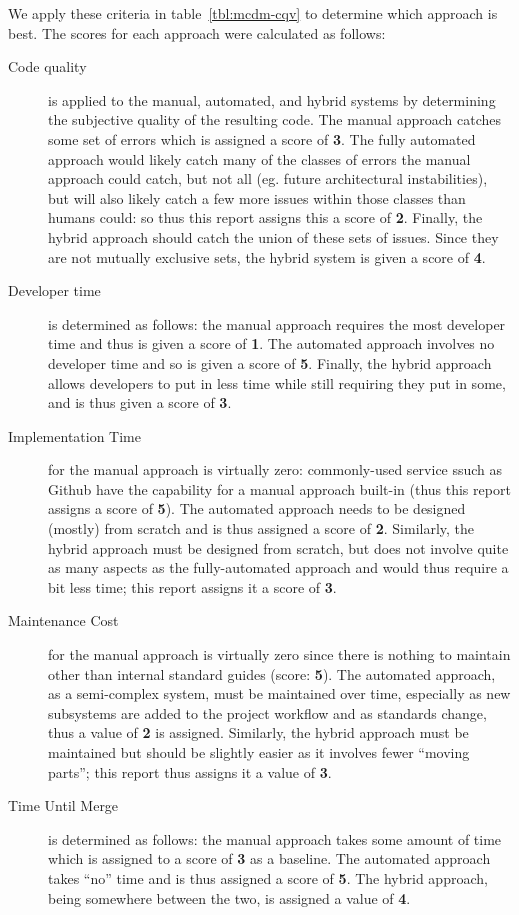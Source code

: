 \documentclass[12pt]{article}
\begin{document}
We apply these criteria in table~\ref{tbl:mcdm-cqv} to determine which approach is best. The scores for each approach were calculated as follows:
\begin{description}
\item[Code quality] is applied to the manual, automated, and hybrid systems by determining the subjective quality of the resulting code. The manual approach catches some set of errors which is assigned a score of {\bf 3}. The fully automated approach would likely catch many of the classes of errors the manual approach could catch, but not all (eg. future architectural instabilities), but will also likely catch a few more issues within those classes than humans could: so thus this report assigns this a score of {\bf 2}. Finally, the hybrid approach should catch the union of these sets of issues. Since they are not mutually exclusive sets, the hybrid system is given a score of {\bf 4}.
\item[Developer time] is determined as follows: the manual approach requires the most developer time and thus is given a score of {\bf 1}. The automated approach involves no developer time and so is given a score of {\bf 5}. Finally, the hybrid approach allows developers to put in less time while still requiring they put in some, and is thus given a score of {\bf 3}.
\item[Implementation Time] for the manual approach is virtually zero: commonly-used service ssuch as Github have the capability for a manual approach built-in (thus this report assigns a score of {\bf 5}). The automated approach needs to be designed (mostly) from scratch and is thus assigned a score of {\bf 2}. Similarly, the hybrid approach must be designed from scratch, but does not involve quite as many aspects as the fully-automated approach and would thus require a bit less time; this report assigns it a score of {\bf 3}.
\item[Maintenance Cost] for the manual approach is virtually zero since there is nothing to maintain other than internal standard guides (score: {\bf 5}). The automated approach, as a semi-complex system, must be maintained over time, especially as new subsystems are added to the project workflow and as standards change, thus a value of {\bf 2} is assigned. Similarly, the hybrid approach must be maintained but should be slightly easier as it involves fewer ``moving parts''; this report thus assigns it a value of {\bf 3}.
\item[Time Until Merge] is determined as follows: the manual approach takes some amount of time which is assigned to a score of {\bf 3} as a baseline. The automated approach takes ``no'' time and is thus assigned a score of {\bf 5}. The hybrid approach, being somewhere between the two, is assigned a value of {\bf 4}.
\end{description}
\end{document}

